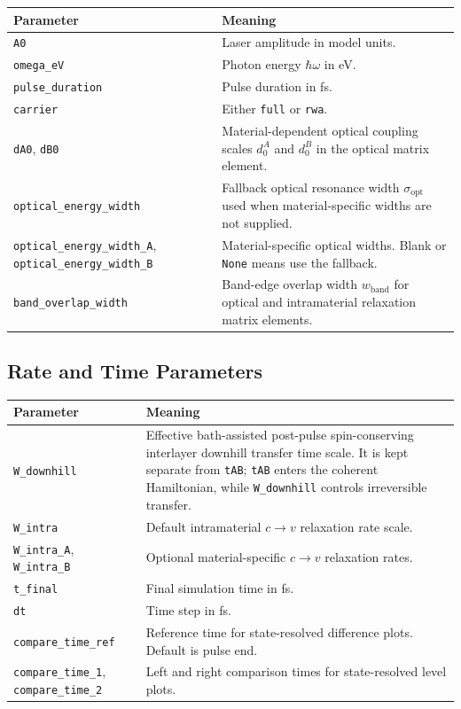 \documentclass[11pt,a4paper]{article}
\begin{document}
\begin{longtable}{p{}p{}}
\toprule
Parameter & Meaning \\
\midrule
\texttt{A0} & Laser amplitude in model units. \\
\texttt{omega\_eV} & Photon energy $\hbar\omega$ in eV. \\
\texttt{pulse\_duration} & Pulse duration in fs. \\
\texttt{carrier} & Either \texttt{full} or \texttt{rwa}. \\
\texttt{dA0}, \texttt{dB0} & Material-dependent optical coupling scales $d^A_0$ and $d^B_0$ in the optical matrix element. \\
\texttt{optical\_energy\_width} & Fallback optical resonance width $\sigma_{\mathrm{opt}}$ used when material-specific widths are not supplied. \\
\texttt{optical\_energy\_width\_A}, \texttt{optical\_energy\_width\_B} & Material-specific optical widths. Blank or \texttt{None} means use the fallback. \\
\texttt{band\_overlap\_width} & Band-edge overlap width $w_{\mathrm{band}}$ for optical and intramaterial relaxation matrix elements. \\
\bottomrule
\end{longtable}

\subsection{Rate and Time Parameters}

\begin{longtable}{p{}p{}}
\toprule
Parameter & Meaning \\
\midrule
\texttt{W\_downhill} & Effective bath-assisted post-pulse spin-conserving interlayer downhill transfer time scale.  It is kept separate from \texttt{tAB}; \texttt{tAB} enters the coherent Hamiltonian, while \texttt{W\_downhill} controls irreversible transfer. \\
\texttt{W\_intra} & Default intramaterial $c\rightarrow v$ relaxation rate scale. \\
\texttt{W\_intra\_A}, \texttt{W\_intra\_B} & Optional material-specific $c\rightarrow v$ relaxation rates. \\
\texttt{t\_final} & Final simulation time in fs. \\
\texttt{dt} & Time step in fs. \\
\texttt{compare\_time\_ref} & Reference time for state-resolved difference plots.  Default is pulse end. \\
\texttt{compare\_time\_1}, \texttt{compare\_time\_2} & Left and right comparison times for state-resolved level plots. \\
\bottomrule
\end{longtable}
\end{document}
